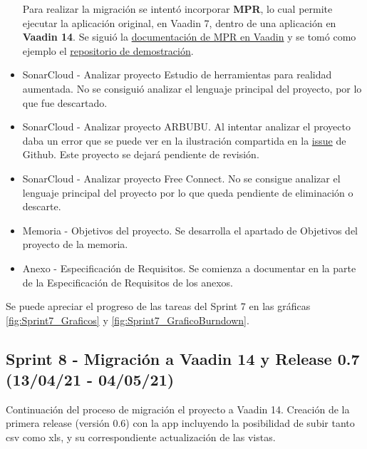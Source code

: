 \begin{itemize}
		Para realizar la migración se intentó incorporar \textbf{MPR}, lo cual permite ejecutar la aplicación original, en Vaadin 7, dentro de una aplicación en \textbf{Vaadin 14}. Se siguió la \href{https://vaadin.com/docs/v14/tools/mpr/introduction/step-1-maven-v7}{documentación de MPR en Vaadin} y se tomó como ejemplo el \href{https://github.com/OlliTietavainenVaadin/mpr-demo/tree/v7}{repositorio de demostración}.
	\item SonarCloud - Analizar proyecto Estudio de herramientas para realidad aumentada. 
		No se consiguió analizar el lenguaje principal del proyecto, por lo que fue descartado.
	\item SonarCloud - Analizar proyecto ARBUBU. 
		Al intentar analizar el proyecto daba un error que se puede ver en la ilustración compartida en la \href{https://github.com/dbo1001/Gestor-TFG-2021/issues/73}{issue} de Github. Este proyecto se dejará pendiente de revisión.
	\item SonarCloud - Analizar proyecto Free Connect. 
		No se consigue analizar el lenguaje principal del proyecto por lo que queda pendiente de eliminación o descarte.
	\item Memoria - Objetivos del proyecto. 
		Se desarrolla el apartado de Objetivos del proyecto de la memoria.
	\item Anexo - Especificación de Requisitos. 
		Se comienza a documentar en la parte de la Especificación de Requisitos de los anexos.
\end{itemize}

Se puede apreciar el progreso de las tareas del Sprint 7 en las gráficas \ref{fig:Sprint7_Graficos} y \ref{fig:Sprint7_GraficoBurndown}.

\subsection{Sprint 8 - Migración a Vaadin 14 y Release 0.7 (13/04/21 - 04/05/21)}
Continuación del proceso de migración el proyecto a Vaadin 14. Creación de la primera release (versión 0.6) con la app incluyendo la posibilidad de subir tanto csv como xls, y su correspondiente actualización de las vistas.

